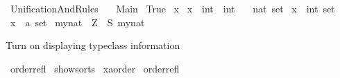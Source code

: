 %
\begin{isabellebody}%
%
%
\isadelimtheory
%
\endisadelimtheory
%
\isatagtheory
{}\isamarkupfalse%
\ UnificationAndRules\isanewline
\ \ \ Main\isanewline
{}%
\endisatagtheory
{\isafoldtheory}%
%
\isadelimtheory
%
\endisadelimtheory
%
\isadelimdocument
%
\endisadelimdocument
%
\isatagdocument
%
\isamarkuptrue%
%
\endisatagdocument
{\isafolddocument}%
%
\isadelimdocument
%
\endisadelimdocument
{}\isamarkupfalse%
\ {\isachardoublequoteopen}True{\isachardoublequoteclose}\isanewline
{}\isamarkupfalse%
\ {\isachardoublequoteopen}x{\isachardoublequoteclose}\isanewline
{}\isamarkupfalse%
\ {\isachardoublequoteopen}x\ {\isacharcolon}{\kern0pt}{\isacharcolon}{\kern0pt}\ int\ {\isasymRightarrow}\ int{\isachardoublequoteclose}\isanewline
{}\isamarkupfalse%
\ {\isachardoublequoteopen}{\isacharbraceleft}{\kern0pt}{}{\isacharbraceright}{\kern0pt}\ {\isacharcolon}{\kern0pt}{\isacharcolon}{\kern0pt}\ nat\ set{\isachardoublequoteclose}\isanewline
{}\isamarkupfalse%
\ {\isachardoublequoteopen}x\ {\isacharcolon}{\kern0pt}{\isacharcolon}{\kern0pt}\ int\ set{\isachardoublequoteclose}\isanewline
{}\isamarkupfalse%
\ {\isachardoublequoteopen}{\isacharbraceleft}{\kern0pt}x{\isacharbraceright}{\kern0pt}\ {\isacharcolon}{\kern0pt}{\isacharcolon}{\kern0pt}\ {\isacharprime}{\kern0pt}a\ set{\isachardoublequoteclose}\isanewline
\isanewline
{}\isamarkupfalse%
\ my{\isacharunderscore}{\kern0pt}nat\ {\isacharequal}{\kern0pt}\ Z\ {\isacharbar}{\kern0pt}\ S\ my{\isacharunderscore}{\kern0pt}nat%
\begin{isamarkuptext}%
Turn on displaying typeclass information%
\end{isamarkuptext}\isamarkuptrue%
\isamarkupfalse%
\ order{\isachardot}{\kern0pt}refl\isanewline
{}\isamarkupfalse%
\ {\isacharbrackleft}{\kern0pt}{\isacharbrackleft}{\kern0pt}show{\isacharunderscore}{\kern0pt}sorts{\isacharbrackright}{\kern0pt}{\isacharbrackright}{\kern0pt}\isanewline
{}\isamarkupfalse%
\ {\isachardoublequoteopen}x{\isacharcolon}{\kern0pt}{\isacharcolon}{\kern0pt}{\isacharprime}{\kern0pt}a{\isacharcolon}{\kern0pt}{\isacharcolon}{\kern0pt}order{\isachardoublequoteclose}\isanewline
\isanewline
{}\isamarkupfalse%
\ order{\isachardot}{\kern0pt}refl\isanewline
{}\isamarkupfalse%

\end{isabellebody}
